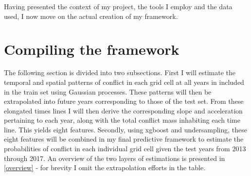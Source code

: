 \documentclass[a4paper]{article}
\begin{document}
Having presented the context of my project, the tools I employ and the data used, I now move on the actual creation of my framework.\par


\section{Compiling the framework}%

The following section is divided into two subsections. First I will estimate the temporal and spatial patterns of conflict in each grid cell at all years in included in the train set using Gaussian processes. These patterns will then be extrapolated into future years corresponding to those of the test set. From these elongated times lines I will then derive the corresponding slope and acceleration pertaining to each year, along with the total conflict mass inhabiting each time line. This yields eight features. Secondly, using xgboost and undersampling, these eight features will be combined in my final predictive framework to estimate the probabilities of conflict in each individual grid cell given the test years from 2013 through 2017. An overview of the two layers of estimations is presented in \autoref{overview} - for brevity I omit the extrapolation efforts in the table.\par
\end{document}
